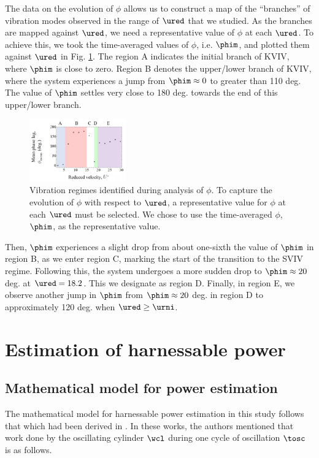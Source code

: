 \documentclass[a4paper,fleqn]{cas-sc}
\begin{document}
The data on the evolution of $\phi$ allows us to construct a map of the ``branches'' of vibration modes observed in the range of $\ured$ that we studied. As the branches are mapped against $\ured$, we need a representative value of $\phi$ at each $\ured$. To achieve this, we took the time-averaged values of $\phi$, i.e. $\phim$, and plotted them against $\ured$ in Fig. \ref{fig:phaseAngleRegime}. The region A indicates the initial branch of  KVIV, where  $\phim$ is close to zero. Region B denotes the upper/lower branch of  KVIV, where the system experiences a jump from  $\phim \approx 0$ to greater than 110 deg. The value of $\phim$ settles very close to 180 deg. towards the end of this upper/lower branch.

\begin{figure}
  \centering
  \includegraphics[width=0.37\textwidth]{figs/figure19}
  \caption{Vibration regimes identified during analysis of $\phi$. To capture the evolution of $\phi$ with respect to $\ured$, a representative value for $\phi$ at each $\ured$ must be selected. We chose to use the time-averaged $\phi$, $\phim$, as the representative value.}
  \label{fig:phaseAngleRegime}
\end{figure}

Then, $\phim$ experiences a slight drop from about one-sixth the value of $\phim$ in region B, as we enter region C, marking the start of the transition to the SVIV regime. Following this, the system undergoes a more sudden drop to $\phim \approx 20$ deg. at $\ured = 18.2$. This we designate as region D. Finally, in region E, we observe another jump in $\phim$ from $\phim \approx 20$ deg. in region D to approximately 120 deg. when $\ured \geq \urni$.

\section{Estimation of harnessable power} \label{sec:estimPow}
\subsection{Mathematical model for power estimation} \label{ssec:mathModel}
The mathematical model for harnessable power estimation in this study follows that which had been derived in \citet{Raghavanetal2007}. In these works, the authors mentioned that work done by the oscillating cylinder $\wcl$ during one cycle of oscillation $\tosc$ is as follows.
\end{document}
